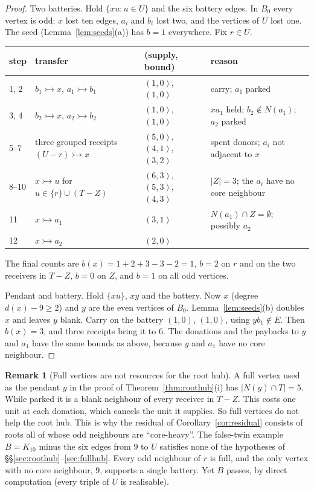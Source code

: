 \documentclass[11pt]{amsart}
\theoremstyle{definition}
\newtheorem{remark}[theorem]{Remark}
\newcommand{\tr}{\rightarrowtail}   %
\begin{document}
\begin{proof}
Two batteries. Hold $\{xu:u\in U\}$ and the six battery edges. In $B_0$ every vertex is odd:
$x$ lost ten edges, $a_i$ and $b_i$ lost two, and the vertices of $U$ lost one. The seed
(Lemma~\ref{lem:seeds}(a)) has $b=1$ everywhere. Fix $r\in U$.

\begin{center}\small
\begin{tabular}{llll}
\toprule
step & transfer & (supply, bound) & reason\\
\midrule
1, 2 & $b_1\tr x$, $a_1\tr b_1$ & $(1,0)$, $(1,0)$ & carry; $a_1$ parked\\
3, 4 & $b_2\tr x$, $a_2\tr b_2$ & $(1,0)$, $(1,0)$ & $xa_1$ held; $b_2\notin N(a_1)$; $a_2$ parked\\
5--7 & three grouped receipts $(U-r)\tr x$ & $(5,0)$, $(4,1)$, $(3,2)$ & spent donors; $a_i$ not adjacent to $x$\\
8--10 & $x\tr u$ for $u\in\{r\}\cup(T-Z)$ & $(6,3)$, $(5,3)$, $(4,3)$ & $|Z|=3$; the $a_i$ have no core neighbour\\
11 & $x\tr a_1$ & $(3,1)$ & $N(a_1)\cap Z=\emptyset$; possibly $a_2$\\
12 & $x\tr a_2$ & $(2,0)$ & \\
\bottomrule
\end{tabular}
\end{center}

The final counts are $b(x)=1+2+3-3-2=1$, $b=2$ on $r$ and on the two receivers in $T-Z$, $b=0$ on
$Z$, and $b=1$ on all odd vertices.

Pendant and battery. Hold $\{xu\}$, $xy$ and the battery. Now $x$ (degree $d(x)-9\ge2$) and $y$ are
the even vertices of $B_0$. Lemma~\ref{lem:seeds}(b) doubles $x$ and leaves $y$ blank. Carry on the
battery $(1,0)$, $(1,0)$, using $yb_1\notin E$. Then $b(x)=3$, and three receipts bring it to $6$. The donations and the paybacks to $y$ and $a_1$ have the same bounds as above, because
$y$ and $a_1$ have no core neighbour.
\end{proof}

\begin{remark}[Full vertices are not resources for the root hub]\label{rem:fullnot}
A full vertex used as the pendant $y$ in the proof of Theorem~\ref{thm:roothub}(i) has
$|N(y)\cap T|=5$. While parked it is a blank neighbour of every receiver in $T-Z$. This costs one
unit at each donation, which cancels the unit it supplies. So full vertices do not help the root
hub. This is why the residual of Corollary~\ref{cor:residual} consists of roots all of whose odd
neighbours are ``core-heavy''. The false-twin example $B=K_{10}$ minus the six edges from $9$ to $U$ satisfies
none of the hypotheses of \S\S\ref{sec:roothub}--\ref{sec:fullhub}. Every odd neighbour of $r$ is
full, and the only vertex with no core neighbour, $9$, supports a single battery. Yet $B$ passes,
by direct computation (every triple of $U$ is realisable).
\end{remark}
\end{document}
